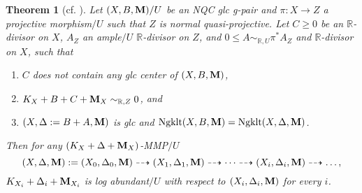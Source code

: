\documentclass[11pt]{amsart}
\numberwithin{equation}{section}
\newcommand{\Mm}{{\bf{M}}}
\newcommand{\Rr}{\mathbb{R}}
\newcommand{\Ngklt}{\operatorname{Ngklt}}
\newtheorem{thm}{Theorem}[section]
\theoremstyle{definition}
\theoremstyle{definition}
\theoremstyle{definition}
\begin{document}
\begin{thm}[{cf. \cite[Theorem 4.1]{Has20b}}]\label{thm: has20b 4.1 rel ver}
Let $(X,B,\Mm)/U$ be an NQC glc g-pair and $\pi: X\rightarrow Z$ a projective morphism$/U$ such that $Z$ is normal quasi-projective. Let $C\geq 0$ be an $\Rr$-divisor on $X$, $A_Z$ an ample$/U$ $\Rr$-divisor on $Z$, and $0\leq A\sim_{\Rr,U}\pi^*A_Z$ and $\Rr$-divisor on $X$, such that
\begin{enumerate}
    \item $C$ does not contain any glc center of $(X,B,\Mm)$,
    \item $K_X+B+C+\Mm_X\sim_{\Rr,Z}0$, and
    \item $(X,\Delta:=B+A,\Mm)$ is glc and $\Ngklt(X,B,\Mm)=\Ngklt(X,\Delta,\Mm)$.
\end{enumerate}
Then for any $(K_{X}+\Delta+\Mm_{X})$-MMP$/U$
$$(X,\Delta,\Mm):=(X_0,\Delta_0,\Mm)\dashrightarrow (X_1,\Delta_1,\Mm)\dashrightarrow\dots\dashrightarrow (X_i,\Delta_i,\Mm)\dashrightarrow\dots,$$
$K_{X_{i}}+\Delta_{i}+\Mm_{X_{i}}$ is log abundant$/U$ with respect to $(X_{i},\Delta_{i},\Mm)$ for every $i$. 
\end{thm}
\end{document}
